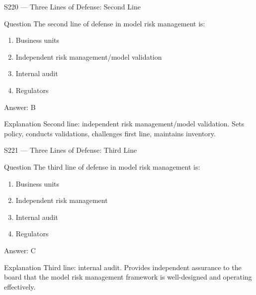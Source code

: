 \documentclass[aspectratio=169,8pt]{beamer}
\begin{document}
\begin{frame}{S220 --- Three Lines of Defense: Second Line}
	\begin{block}{Question}
		The second line of defense in model risk management is:
		\begin{enumerate}
			\item Business units
			\item Independent risk management/model validation
			\item Internal audit
			\item Regulators
		\end{enumerate}
	\end{block}
	\begin{exampleblock}{Answer: B}\end{exampleblock}
	\begin{block}{Explanation}
		Second line: independent risk management/model validation. Sets policy, conducts validations, challenges first line, maintains inventory.
	\end{block}
\end{frame}

\begin{frame}{S221 --- Three Lines of Defense: Third Line}
	\begin{block}{Question}
		The third line of defense in model risk management is:
		\begin{enumerate}
			\item Business units
			\item Independent risk management
			\item Internal audit
			\item Regulators
		\end{enumerate}
	\end{block}
	\begin{exampleblock}{Answer: C}\end{exampleblock}
	\begin{block}{Explanation}
		Third line: internal audit. Provides independent assurance to the board that the model risk management framework is well-designed and operating effectively.
	\end{block}
\end{frame}
\end{document}
